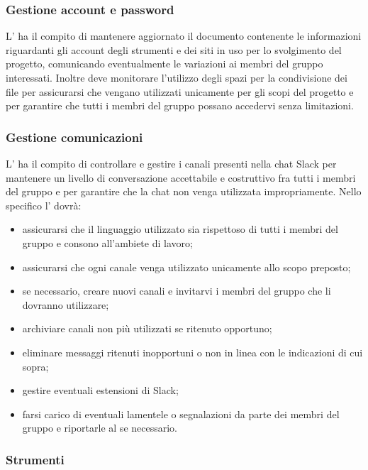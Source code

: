         \subsubsection{Gestione account e password}
        L'\amministratore{} ha il compito di mantenere aggiornato il documento contenente le informazioni riguardanti gli account degli strumenti e dei siti in uso per lo svolgimento del progetto, comunicando eventualmente le variazioni ai membri del gruppo interessati. Inoltre deve monitorare l'utilizzo degli spazi per la condivisione dei file per assicurarsi che vengano utilizzati unicamente per gli scopi del progetto e per garantire che tutti i membri del gruppo possano accedervi senza limitazioni.
        
		\subsubsection{Gestione comunicazioni}
		L'\amministratore{} ha il compito di controllare e gestire i canali presenti nella chat Slack per mantenere un livello di conversazione accettabile e costruttivo fra tutti i membri del gruppo e per garantire che la chat non venga utilizzata impropriamente.
		Nello specifico l'\amministratore{} dovrà:
		\begin{itemize}
			\item assicurarsi che il linguaggio utilizzato sia rispettoso di tutti i membri del gruppo e consono all'ambiete di lavoro;
			\item assicurarsi che ogni canale venga utilizzato unicamente allo scopo preposto;
			\item se necessario, creare nuovi canali e invitarvi i membri del gruppo che li dovranno utilizzare;
			\item archiviare canali non più utilizzati se ritenuto opportuno;
			\item eliminare messaggi ritenuti inopportuni o non in linea con le indicazioni di cui sopra;
			\item gestire eventuali estensioni di Slack;
			\item farsi carico di eventuali lamentele o segnalazioni da parte dei membri del gruppo e riportarle al \responsabilediprogetto{} se necessario.
		\end{itemize}
	\subsubsection{Strumenti}
